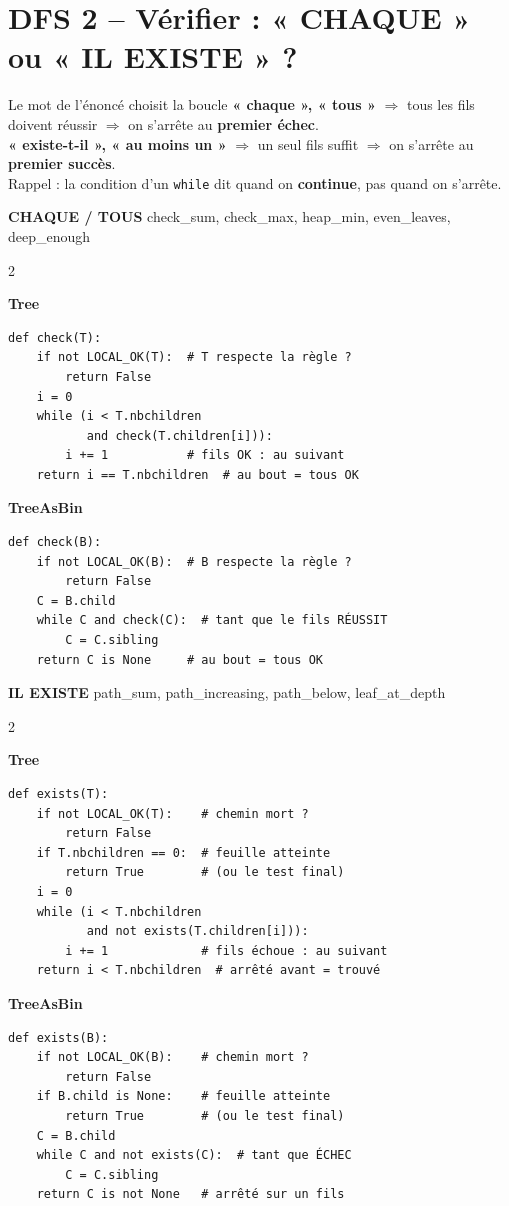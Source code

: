 \documentclass[10pt,a4paper]{article}
\newcommand{\code}[1]{\texttt{#1}}
\newcommand{\TREE}{\colorbox{treec}{\color{white}\strut\small\bfseries\ttfamily Tree}}
\newcommand{\TAB}{\colorbox{tabc}{\color{white}\strut\small\bfseries\ttfamily TreeAsBin}}
\newcommand{\sect}[1]{\section*{\color{theme}#1}}
\begin{document}
\newpage
\sect{DFS 2 -- V\'erifier : « CHAQUE » ou « IL EXISTE » ?}

\begin{regle}{Le mot de l'\'enonc\'e choisit la boucle}
\textbf{« chaque », « tous »} $\Rightarrow$ tous les fils doivent r\'eussir $\Rightarrow$ on s'arr\^ete au \textbf{premier \'echec}.\\
\textbf{« existe-t-il », « au moins un »} $\Rightarrow$ un seul fils suffit $\Rightarrow$ on s'arr\^ete au \textbf{premier succ\`es}.\\[2pt]
Rappel : la condition d'un \code{while} dit quand on \textbf{continue}, pas quand on s'arr\^ete.
\end{regle}

\textbf{\large CHAQUE / TOUS} \hfill {\small check\_sum, check\_max, heap\_min, even\_leaves, deep\_enough}
\begin{multicols}{2}
\TREE
\begin{lstlisting}[style=tree]
def check(T):
    if not LOCAL_OK(T):  # T respecte la règle ?
        return False
    i = 0
    while (i < T.nbchildren
           and check(T.children[i])):
        i += 1           # fils OK : au suivant
    return i == T.nbchildren  # au bout = tous OK
\end{lstlisting}
\columnbreak
\TAB
\begin{lstlisting}[style=tab]
def check(B):
    if not LOCAL_OK(B):  # B respecte la règle ?
        return False
    C = B.child
    while C and check(C):  # tant que le fils RÉUSSIT
        C = C.sibling
    return C is None     # au bout = tous OK
\end{lstlisting}
\end{multicols}

\textbf{\large IL EXISTE} \hfill {\small path\_sum, path\_increasing, path\_below, leaf\_at\_depth}
\begin{multicols}{2}
\TREE
\begin{lstlisting}[style=tree]
def exists(T):
    if not LOCAL_OK(T):    # chemin mort ?
        return False
    if T.nbchildren == 0:  # feuille atteinte
        return True        # (ou le test final)
    i = 0
    while (i < T.nbchildren
           and not exists(T.children[i])):
        i += 1             # fils échoue : au suivant
    return i < T.nbchildren  # arrêté avant = trouvé
\end{lstlisting}
\columnbreak
\TAB
\begin{lstlisting}[style=tab]
def exists(B):
    if not LOCAL_OK(B):    # chemin mort ?
        return False
    if B.child is None:    # feuille atteinte
        return True        # (ou le test final)
    C = B.child
    while C and not exists(C):  # tant que ÉCHEC
        C = C.sibling
    return C is not None   # arrêté sur un fils
\end{lstlisting}
\end{multicols}
\end{document}

